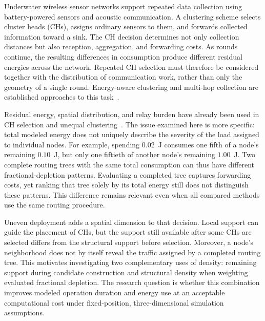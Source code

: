 \label{sec:introduction}

Underwater wireless sensor networks support repeated data collection using
battery-powered sensors and acoustic communication. A clustering scheme
selects cluster heads (CHs), assigns ordinary sensors to them, and forwards
collected information toward a sink. The CH decision determines not only
collection distances but also reception, aggregation, and forwarding costs.
As rounds continue, the resulting differences in consumption produce
different residual energies across the network. Repeated CH selection must
therefore be considered together with the distribution of communication
work, rather than only the geometry of a single round. Energy-aware
clustering and multi-hop collection are established approaches to this
task~\cite{Xiao2020ACOCR,Nguyen2021EECMR}.

Residual energy, spatial distribution, and relay burden have already been
used in CH selection and unequal clustering~\cite{Hou2022UCPSO,Zhu2021SoftKMeans}.
The issue examined here is more specific: total modeled energy does not
uniquely describe the severity of the load assigned to individual nodes.
For example, spending $0.02$~J consumes one fifth of a node's remaining
$0.10$~J, but only one fiftieth of another node's remaining $1.00$~J.
Two complete routing trees with the same total consumption can thus
have different fractional-depletion patterns. Evaluating a completed tree
captures forwarding costs, yet ranking that tree solely by its total
energy still does not distinguish these patterns. This difference remains
relevant even when all compared methods use the same routing procedure.

Uneven deployment adds a spatial dimension to that decision. Local
support can guide the placement of CHs, but the support still available
after some CHs are selected differs from the structural support before
selection. Moreover, a node's neighborhood does not by itself reveal the
traffic assigned by a completed routing tree. This motivates investigating
two complementary uses of density: remaining support during candidate
construction and structural density when weighting evaluated fractional
depletion. The research question is whether this combination improves
modeled operation duration and energy use at an acceptable computational
cost under fixed-position, three-dimensional simulation assumptions.


